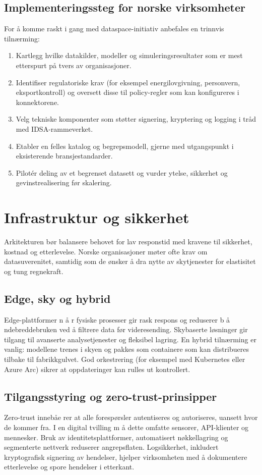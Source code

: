\subsection{Implementeringssteg for norske virksomheter}
For å komme raskt i gang med dataspace-initiativ anbefales en trinnvis tilnærming:
\begin{enumerate}
    \item Kartlegg hvilke datakilder, modeller og simuleringsresultater som er mest etterspurt på tvers av organisasjoner.
    \item Identifiser regulatoriske krav (for eksempel energilovgivning, personvern, eksportkontroll) og oversett disse til
    policy-regler som kan konfigureres i konnektorene.
    \item Velg tekniske komponenter som støtter signering, kryptering og logging i tråd med IDSA-rammeverket.
    \item Etabler en felles katalog og begrepsmodell, gjerne med utgangspunkt i eksisterende bransjestandarder.
    \item Pilotér deling av et begrenset datasett og vurder ytelse, sikkerhet og gevinstrealisering før skalering.
\end{enumerate}

\section{Infrastruktur og sikkerhet}
Arkitekturen bør balansere behovet for lav responstid med kravene til sikkerhet, kostnad og etterlevelse. Norske organisasjoner møter ofte krav om datasuverenitet, samtidig som de ønsker  å dra nytte av skytjenester for elastisitet og tung regnekraft.

\subsection{Edge, sky og hybrid}
Edge-plattformer n å r fysiske prosesser gir rask respons og reduserer b å ndebreddebruken ved  å filtrere data før videresending. Skybaserte løsninger gir tilgang til avanserte analysetjenester og fleksibel lagring. En hybrid tilnærming er vanlig: modellene trenes i skyen og pakkes som containere som kan distribueres tilbake til fabrikkgulvet. God orkestrering (for eksempel med Kubernetes eller Azure Arc) sikrer at oppdateringer kan rulles ut kontrollert.

\subsection{Tilgangsstyring og zero-trust-prinsipper}
Zero-trust innebåe rer at alle forespørsler autentiseres og autoriseres, uansett hvor de kommer fra. I en digital tvilling m å dette omfatte sensorer, API-klienter og mennesker. Bruk av identitetsplattformer, automatisert nøkkellagring og segmenterte nettverk reduserer angrepsflaten. Logsikkerhet, inkludert kryptografisk signering av hendelser, hjelper virksomheten med  å dokumentere etterlevelse og spore hendelser i etterkant.

